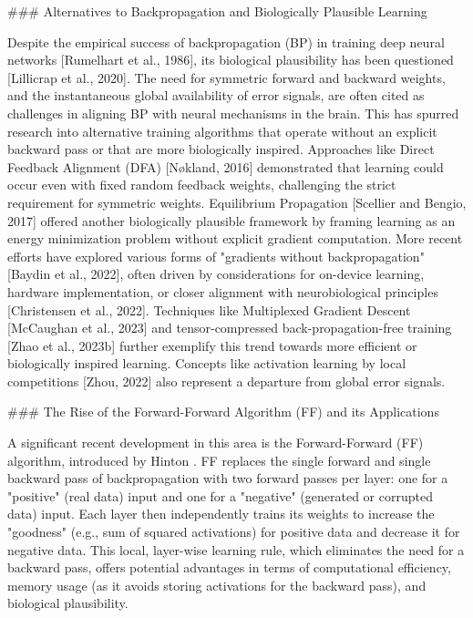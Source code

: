 \documentclass{article}
\begin{document}
\#\#\# Alternatives to Backpropagation and Biologically Plausible Learning

Despite the empirical success of backpropagation (BP) in training deep neural networks [Rumelhart et al., 1986], its biological plausibility has been questioned [Lillicrap et al., 2020]. The need for symmetric forward and backward weights, and the instantaneous global availability of error signals, are often cited as challenges in aligning BP with neural mechanisms in the brain. This has spurred research into alternative training algorithms that operate without an explicit backward pass or that are more biologically inspired. Approaches like Direct Feedback Alignment (DFA) [Nøkland, 2016] demonstrated that learning could occur even with fixed random feedback weights, challenging the strict requirement for symmetric weights. Equilibrium Propagation [Scellier and Bengio, 2017] offered another biologically plausible framework by framing learning as an energy minimization problem without explicit gradient computation. More recent efforts have explored various forms of "gradients without backpropagation" [Baydin et al., 2022], often driven by considerations for on-device learning, hardware implementation, or closer alignment with neurobiological principles [Christensen et al., 2022]. Techniques like Multiplexed Gradient Descent [McCaughan et al., 2023] and tensor-compressed back-propagation-free training [Zhao et al., 2023b] further exemplify this trend towards more efficient or biologically inspired learning. Concepts like activation learning by local competitions [Zhou, 2022] also represent a departure from global error signals.

\#\#\# The Rise of the Forward-Forward Algorithm (FF) and its Applications

A significant recent development in this area is the Forward-Forward (FF) algorithm, introduced by Hinton \cite{2022}. FF replaces the single forward and single backward pass of backpropagation with two forward passes per layer: one for a "positive" (real data) input and one for a "negative" (generated or corrupted data) input. Each layer then independently trains its weights to increase the "goodness" (e.g., sum of squared activations) for positive data and decrease it for negative data. This local, layer-wise learning rule, which eliminates the need for a backward pass, offers potential advantages in terms of computational efficiency, memory usage (as it avoids storing activations for the backward pass), and biological plausibility.
\end{document}
